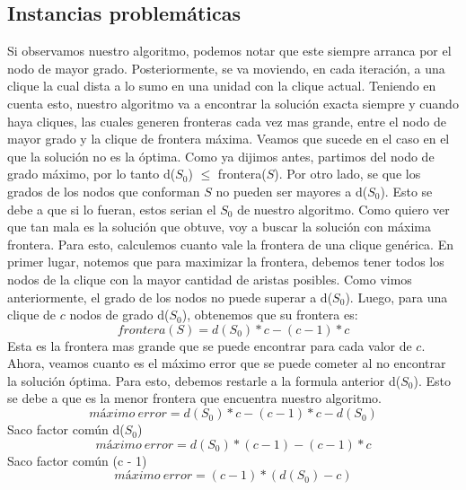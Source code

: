 \subsection{Instancias problemáticas}
Si observamos nuestro algoritmo, podemos notar que este siempre arranca por el nodo de mayor grado. Posteriormente, se va moviendo, en cada iteración, a una clique la cual dista a lo sumo en una unidad con la clique actual. Teniendo en cuenta esto, nuestro algoritmo va a encontrar la solución exacta siempre y cuando haya cliques, las cuales generen fronteras cada vez mas grande, entre el nodo de mayor grado y la clique de frontera máxima.
\newline
Veamos que sucede en el caso en el que la solución no es la óptima. Como ya dijimos antes, partimos del nodo de grado máximo, por lo tanto d($S_{0}$) $\leq$ frontera($S$). Por otro lado, se que los grados de los nodos que conforman $S$ no pueden ser mayores a d($S_{0}$). Esto se debe a que si lo fueran, estos serian el $S_{0}$ de nuestro algoritmo. Como quiero ver que tan mala es la solución que obtuve, voy a buscar la solución con máxima frontera. Para esto, calculemos cuanto vale la frontera de una clique genérica. \newline
En primer lugar, notemos que para maximizar la frontera, debemos tener todos los nodos de la clique con la mayor cantidad de aristas posibles. Como vimos anteriormente, el grado de los nodos no puede superar a d($S_{0}$). Luego, para una clique de $c$ nodos de grado d($S_{0}$), obtenemos que su frontera es:
\begin{equation}
  frontera(S) = d(S_{0}) * c - (c - 1) * c
\end{equation} 
Esta es la frontera mas grande que se puede encontrar para cada valor de $c$.
\newline 
Ahora, veamos cuanto es el máximo error que se puede cometer al no encontrar la solución óptima. Para esto, debemos restarle a la formula anterior d($S_{0}$). Esto se debe a que es la menor frontera que encuentra nuestro algoritmo.
\begin{equation}
  máximo\ error = d(S_{0}) * c - (c - 1) * c - d(S_{0}) 
\end{equation} 
Saco factor común d($S_{0}$)
\begin{equation}
  máximo\ error = d(S_{0}) * (c - 1) - (c - 1) * c 
\end{equation} 
Saco factor común (c - 1)
\begin{equation}
  máximo\ error = (c - 1) * (d(S_{0}) - c) 
\end{equation} 
